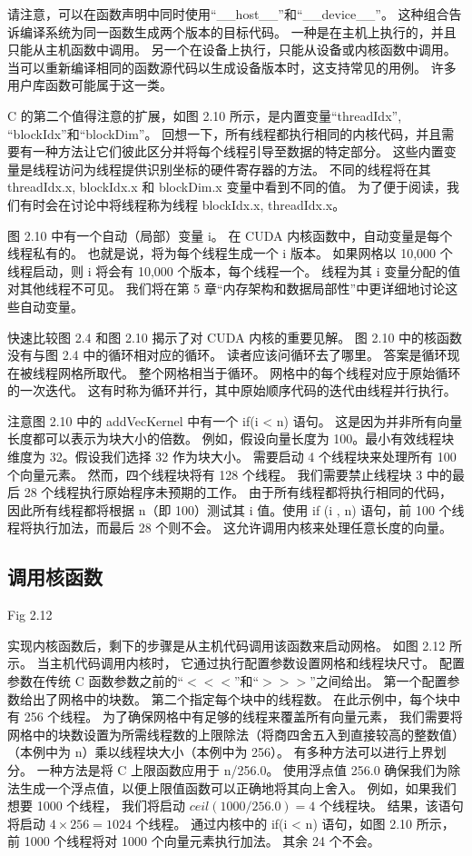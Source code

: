 请注意，可以在函数声明中同时使用“\_\_host\_\_”和“\_\_device\_\_”。 
这种组合告诉编译系统为同一函数生成两个版本的目标代码。 一种是在主机上执行的，并且只能从主机函数中调用。 
另一个在设备上执行，只能从设备或内核函数中调用。 当可以重新编译相同的函数源代码以生成设备版本时，这支持常见的用例。 
许多用户库函数可能属于这一类。

C 的第二个值得注意的扩展，如图 2.10 所示，是内置变量“threadIdx”, “blockIdx”和“blockDim”。 
回想一下，所有线程都执行相同的内核代码，并且需要有一种方法让它们彼此区分并将每个线程引导至数据的特定部分。 
这些内置变量是线程访问为线程提供识别坐标的硬件寄存器的方法。 
不同的线程将在其 threadIdx.x, blockIdx.x 和 blockDim.x 变量中看到不同的值。 
为了便于阅读，我们有时会在讨论中将线程称为线程 blockIdx.x, threadIdx.x。

图 2.10 中有一个自动（局部）变量 i。 在 CUDA 内核函数中，自动变量是每个线程私有的。 
也就是说，将为每个线程生成一个 i 版本。 如果网格以 10,000 个线程启动，则 i 将会有 10,000 个版本，每个线程一个。 
线程为其 i 变量分配的值对其他线程不可见。 我们将在第 5 章“内存架构和数据局部性”中更详细地讨论这些自动变量。

快速比较图 2.4 和图 2.10 揭示了对 CUDA 内核的重要见解。 图 2.10 中的核函数没有与图 2.4 中的循环相对应的循环。 
读者应该问循环去了哪里。 答案是循环现在被线程网格所取代。 整个网格相当于循环。 网格中的每个线程对应于原始循环的一次迭代。 
这有时称为循环并行，其中原始顺序代码的迭代由线程并行执行。

注意图 2.10 中的 addVecKernel 中有一个 if(i < n) 语句。 这是因为并非所有向量长度都可以表示为块大小的倍数。 
例如，假设向量长度为 100。最小有效线程块维度为 32。假设我们选择 32 作为块大小。 
需要启动 4 个线程块来处理所有 100 个向量元素。 然而，四个线程块将有 128 个线程。 
我们需要禁止线程块 3 中的最后 28 个线程执行原始程序未预期的工作。 由于所有线程都将执行相同的代码，
因此所有线程都将根据 n（即 100）测试其 i 值。使用 if (i , n) 语句，前 100 个线程将执行加法，而最后 28 个则不会。 
这允许调用内核来处理任意长度的向量。

\subsection{调用核函数}
{\color{red} Fig 2.12}

实现内核函数后，剩下的步骤是从主机代码调用该函数来启动网格。 如图 2.12 所示。 当主机代码调用内核时，
它通过执行配置参数设置网格和线程块尺寸。 配置参数在传统 C 函数参数之前的“$<<<$”和“$>>>$”之间给出。 
第一个配置参数给出了网格中的块数。 第二个指定每个块中的线程数。 在此示例中，每个块中有 256 个线程。 
为了确保网格中有足够的线程来覆盖所有向量元素，
我们需要将网格中的块数设置为所需线程数的上限除法（将商四舍五入到直接较高的整数值） 
（本例中为 n）乘以线程块大小（本例中为 256）。 有多种方法可以进行上界划分。 一种方法是将 C 上限函数应用于 n/256.0。 
使用浮点值 256.0 确保我们为除法生成一个浮点值，以便上限值函数可以正确地将其向上舍入。 例如，如果我们想要 1000 个线程，
我们将启动 $ceil(1000/256.0) = 4$ 个线程块。 结果，该语句将启动 $4 \times 256 = 1024$ 个线程。 
通过内核中的 if(i < n) 语句，如图 2.10 所示，前 1000 个线程将对 1000 个向量元素执行加法。 其余 24 个不会。

